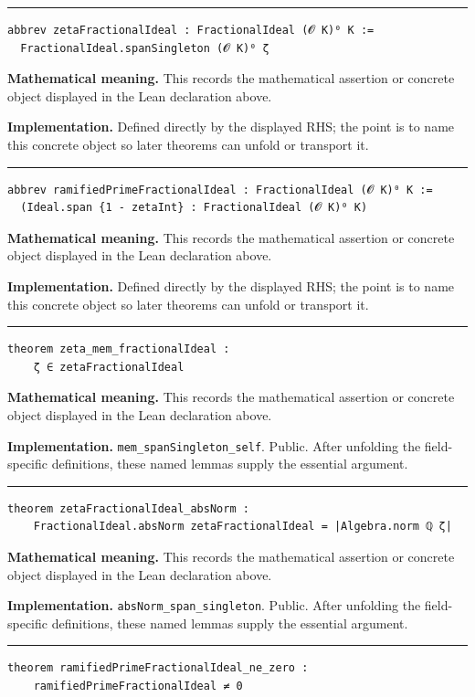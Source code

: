 \documentclass[UTF8,a4paper,11pt,fontset=fandol]{ctexart}
\theoremstyle{definition}
\newcommand{\statementsep}{\par\medskip\hrule\medskip}
\begin{document}
\statementsep
\begin{verbatim}
abbrev zetaFractionalIdeal : FractionalIdeal (𝓞 K)⁰ K :=
  FractionalIdeal.spanSingleton (𝓞 K)⁰ ζ
\end{verbatim}
\noindent\textbf{Mathematical meaning.} This records the mathematical assertion or concrete object displayed in the Lean declaration above.\par
\noindent\textbf{Implementation.} Defined directly by the displayed RHS; the point is to name this concrete object so later theorems can unfold or transport it.\par
\statementsep
\begin{verbatim}
abbrev ramifiedPrimeFractionalIdeal : FractionalIdeal (𝓞 K)⁰ K :=
  (Ideal.span {1 - zetaInt} : FractionalIdeal (𝓞 K)⁰ K)
\end{verbatim}
\noindent\textbf{Mathematical meaning.} This records the mathematical assertion or concrete object displayed in the Lean declaration above.\par
\noindent\textbf{Implementation.} Defined directly by the displayed RHS; the point is to name this concrete object so later theorems can unfold or transport it.\par
\statementsep
\begin{verbatim}
theorem zeta_mem_fractionalIdeal :
    ζ ∈ zetaFractionalIdeal
\end{verbatim}
\noindent\textbf{Mathematical meaning.} This records the mathematical assertion or concrete object displayed in the Lean declaration above.\par
\noindent\textbf{Implementation.} \texttt{mem\_\allowbreak{}spanSingleton\_\allowbreak{}self}. Public. After unfolding the field-specific definitions, these named lemmas supply the essential argument.\par
\statementsep
\begin{verbatim}
theorem zetaFractionalIdeal_absNorm :
    FractionalIdeal.absNorm zetaFractionalIdeal = |Algebra.norm ℚ ζ|
\end{verbatim}
\noindent\textbf{Mathematical meaning.} This records the mathematical assertion or concrete object displayed in the Lean declaration above.\par
\noindent\textbf{Implementation.} \texttt{absNorm\_\allowbreak{}span\_\allowbreak{}singleton}. Public. After unfolding the field-specific definitions, these named lemmas supply the essential argument.\par
\statementsep
\begin{verbatim}
theorem ramifiedPrimeFractionalIdeal_ne_zero :
    ramifiedPrimeFractionalIdeal ≠ 0
\end{verbatim}
\end{document}
